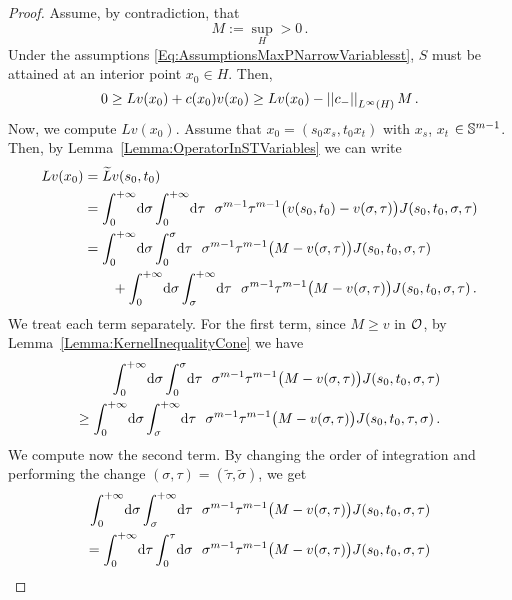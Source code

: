 \begin{proof}
	Assume, by contradiction, that
	$$
	M := \sup_H > 0\,.
	$$
	Under the assumptions \eqref{Eq:AssumptionsMaxPNarrowVariablesst}, $S$ must be attained at an interior point $x_0 \in H$. Then,
	\begin{equation}
	\label{Eq:InequalitiesMaxPNarrowProofVariablesst}
	0 \geq L v(x_0) + c(x_0)v(x_0) \geq L v(x_0) - \left | \left |{c_-} \right | \right |_{L^\infty(H)}M\,.
	\end{equation}
	Now, we compute $L v(x_0)$. Assume that $x_0 = (s_0 x_s, t_0 x_t)$ with $x_s$, $x_t$ $\in \mathbb{S}^{m-1}$. Then, by Lemma~\ref{Lemma:OperatorInSTVariables} we can write
	\begin{align*}
	Lv(x_0) &= \widetilde{L} v (s_0,t_0) \\
	&=  \int_0^{+\infty} \!\! \d \sigma \int_0^{+\infty} \!\! \d \tau \ \ \sigma^{m-1} \tau^{m-1} \big(v(s_0,t_0) - v(\sigma, \tau)\big) J(s_0,t_0,\sigma, \tau)   \\
	& = \int_0^{+\infty}  \!\! \d \sigma \int_0^{\sigma}  \!\! \d \tau \ \ \sigma^{m-1} \tau^{m-1} \big(M - v(\sigma, \tau)\big)J(s_0,t_0,\sigma, \tau)   \\
	& \quad \quad + \int_0^{+\infty}  \!\!  \d \sigma \int_{\sigma}^{+\infty} \!\!  \d \tau \ \ \sigma^{m-1} \tau^{m-1} \big(M - v(\sigma, \tau)\big) J(s_0,t_0,\sigma, \tau)\,.
	\end{align*}
	We treat each term separately. For the first term, since $M \geq v$ in $\mathcal{O}$, by Lemma~\ref{Lemma:KernelInequalityCone} we have
	\begin{align*}
	\int_0^{+\infty}  \!\! \d \sigma \int_0^{\sigma}  \!\! \d \tau \ \ \sigma^{m-1} \tau^{m-1} \big(M - v(\sigma, \tau)\big)J(s_0,t_0,\sigma, \tau)   \\
	\geq \int_0^{+\infty}  \!\!  \d \sigma \int_{\sigma}^{+\infty} \!\!  \d \tau \ \ \sigma^{m-1} \tau^{m-1} \big(M - v(\sigma, \tau)\big) J(s_0,t_0, \tau, \sigma)\,.
	\end{align*}
	We compute now the second term. By changing the order of integration and performing the change $(\sigma,\tau) = (\tilde{\tau}, \tilde{\sigma})$, we get
	\begin{align*}
	\int_0^{+\infty} \!\!  \d \sigma \int_{\sigma}^{+\infty} \!\!  \d \tau \ \ \sigma^{m-1} \tau^{m-1} \big(M - v(\sigma, \tau)\big) J(s_0,t_0,\sigma, \tau) \\
	=  \int_{0}^{+\infty}  \!\! \d \tau \int_0^{\tau}   \!\! \d \sigma \ \ \sigma^{m-1} \tau^{m-1}\big(M - v(\sigma, \tau)\big) J(s_0,t_0,\sigma, \tau)   \\

\end{align*}
\end{proof}
